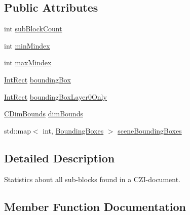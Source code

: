 \subsection*{Public Attributes}
\begin{DoxyCompactItemize}
\item 
int \hyperlink{structlib_c_z_i_1_1_sub_block_statistics_a2507642d2007c30f4984cc2618203534}{sub\+Block\+Count}
\item 
int \hyperlink{structlib_c_z_i_1_1_sub_block_statistics_a3123641e5b748a84744082a651f199a9}{min\+Mindex}
\item 
int \hyperlink{structlib_c_z_i_1_1_sub_block_statistics_ad49c1710047fea5751e8b27263b0c62d}{max\+Mindex}
\item 
\hyperlink{structlib_c_z_i_1_1_int_rect}{Int\+Rect} \hyperlink{structlib_c_z_i_1_1_sub_block_statistics_a924c2adf7f3e132470dfeb06ea1e958c}{bounding\+Box}
\item 
\hyperlink{structlib_c_z_i_1_1_int_rect}{Int\+Rect} \hyperlink{structlib_c_z_i_1_1_sub_block_statistics_a5256d470970ed24507b6bd1fadf32096}{bounding\+Box\+Layer0\+Only}
\item 
\hyperlink{classlib_c_z_i_1_1_c_dim_bounds}{C\+Dim\+Bounds} \hyperlink{structlib_c_z_i_1_1_sub_block_statistics_a10b6e7fb9312e93b1e9785daed56e44e}{dim\+Bounds}
\item 
std\+::map$<$ int, \hyperlink{structlib_c_z_i_1_1_bounding_boxes}{Bounding\+Boxes} $>$ \hyperlink{structlib_c_z_i_1_1_sub_block_statistics_ab02ae7bcd25f34008ec9d5afa8a4efec}{scene\+Bounding\+Boxes}
\end{DoxyCompactItemize}


\subsection{Detailed Description}
Statistics about all sub-\/blocks found in a C\+Z\+I-\/document. 

\subsection{Member Function Documentation}
\mbox{\label{structlib_c_z_i_1_1_sub_block_statistics_a61f70e5acf237b4d4550f18dbc23b4a7}} 
